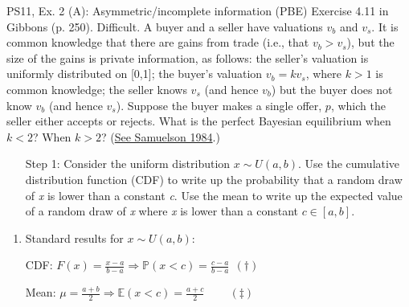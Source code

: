 \begin{frame}{PS11, Ex. 2 (A): Asymmetric/incomplete information (PBE)}
    Exercise 4.11 in Gibbons (p. 250). Difficult. A buyer and a seller have valuations $v_b$ and $v_s$. It is common knowledge that there are gains from trade (i.e., that $v_b > v_s$), but the size of the gains is private information, as follows: the seller’s valuation is uniformly distributed on [0,1]; the buyer’s valuation $v_b = kv_s$, where $k > 1$ is common knowledge; the seller knows $v_s$ (and hence $v_b$) but the buyer does not know $v_b$ (and hence $v_s$). Suppose the buyer makes a single offer, $p$, which the seller either accepts or rejects. What is the perfect Bayesian equilibrium when $k < 2$? When $k > 2$? (\href{https://www.jstor.org/stable/1911195}{See Samuelson 1984}.) \vspace{-8pt}
    \begin{multicols}{2}
      \begin{itemize}
        \item[Step 1:] Consider the uniform distribution $x\sim U(a, b)$. Use the cumulative distribution function (CDF) to write up the probability that a random draw of \textit{x} is lower than a constant \textit{c}. Use the mean to write up the expected value of a random draw of \textit{x} where \textit{x} is lower than a constant $c\in[a,b]$.
      \end{itemize}
      \vfill\null\columnbreak
      \begin{enumerate}
        \item Standard results for $x\sim U(a, b):$
        \item[CDF:] $F(x)=\frac{x-a}{b-a}\Rightarrow\mathbb{P}(x<c)=\frac{c-a}{b-a}\ \ (\dagger)$
        \item[Mean:] $\mu=\frac{a+b}{2}\Rightarrow\mathbb{E}(x<c)=\frac{a+c}{2}\quad\quad\ (\ddagger)$
      \end{enumerate}
      \vfill\null
    \end{multicols}
\end{frame}
